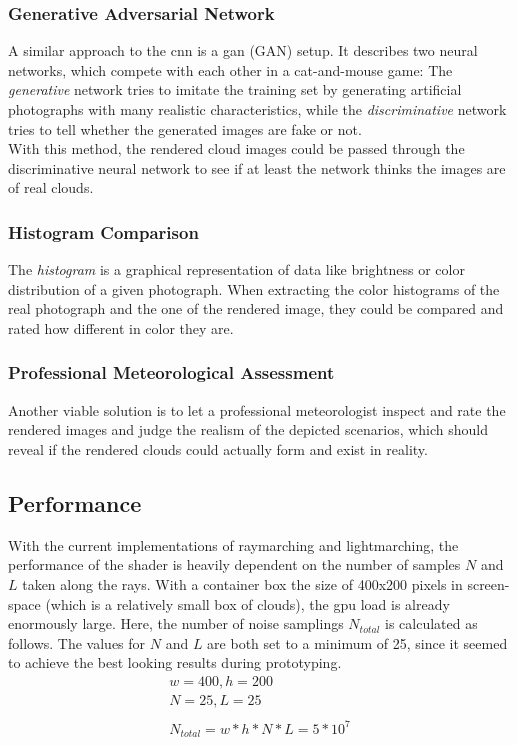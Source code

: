 \subsubsection{Generative Adversarial Network}
A similar approach to the \gls{cnn} is a  \gls{gan} (GAN) setup. It describes two neural networks, which compete with each other in a cat-and-mouse game: The \textit{generative} network tries to imitate the training set by generating artificial photographs with many realistic characteristics, while the \textit{discriminative} network tries to tell whether the generated images are fake or not.
\\
With this method, the rendered cloud images could be passed through the discriminative neural network to see if at least the network thinks the images are of real clouds.

\subsubsection{Histogram Comparison}
The \textit{\gls{histogram}} is a graphical representation of data like brightness or color distribution of a given photograph.
When extracting the color \gls{histogram}s of the real photograph and the one of the rendered image, they could be compared and rated how different in color they are.

\subsubsection{Professional Meteorological Assessment}
Another viable solution is to let a professional meteorologist inspect and rate the rendered images and judge the realism of the depicted scenarios, which should reveal if the rendered clouds could actually form and exist in reality.

\clearpage
\subsection{Performance}
With the current implementations of \gls{raymarching} and \gls{lightmarching}, the performance of the shader is heavily dependent on the number of samples $N$ and $L$ taken along the rays.
With a container box the size of 400x200 pixels in screen-space (which is a relatively small box of clouds), the \gls{gpu} load is already enormously large. 
Here, the number of noise samplings $N_{total}$ is calculated as follows. The values for $N$ and $L$ are both set to a minimum of 25, since it seemed to achieve the best looking results during prototyping.
$$ 
\begin{array}{l}
    w = 400, h = 200\\
    N = 25, L = 25\\ \\
    N_{total} = w * h * N * L = 5 * 10^7
\end{array}
$$


